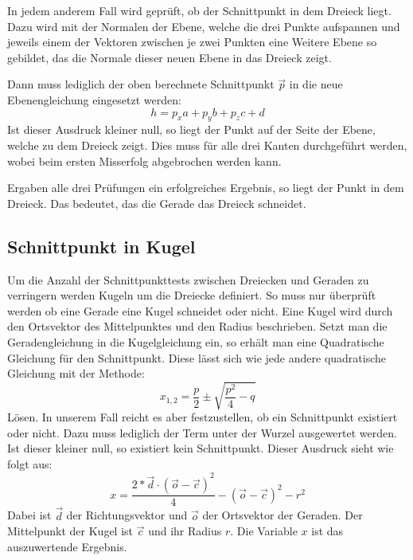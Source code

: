 \documentclass[final,a4paper,11pt,notitlepage,halfparskip]{scrreprt}
\begin{document}
In jedem anderem Fall wird geprüft, ob der Schnittpunkt in dem Dreieck liegt.
Dazu wird mit der Normalen der Ebene, welche die drei Punkte aufspannen und jeweils
einem der Vektoren zwischen je zwei Punkten eine Weitere Ebene so gebildet,
das die Normale dieser neuen Ebene in das Dreieck zeigt.

Dann muss lediglich der oben berechnete Schnittpunkt $\vec{p}$ in die neue
Ebenengleichung eingesetzt werden:
$$h = p_x a + p_y b + p_z c + d$$
Ist dieser Ausdruck kleiner null, so liegt der Punkt auf der Seite der Ebene,
welche zu dem Dreieck zeigt. Dies muss für alle drei Kanten durchgeführt werden,
wobei beim ersten Misserfolg abgebrochen werden kann.

Ergaben alle drei Prüfungen ein erfolgreiches Ergebnis, so liegt der Punkt in
dem Dreieck. Das bedeutet, das die Gerade das Dreieck schneidet.

\subsection{Schnittpunkt in Kugel}
Um die Anzahl der Schnittpunkttests zwischen Dreiecken und Geraden zu verringern
werden Kugeln um die Dreiecke definiert. So muss nur überprüft werden ob eine
Gerade eine Kugel schneidet oder nicht. Eine Kugel wird durch den Ortsvektor des
Mittelpunktes und den Radius beschrieben. Setzt man die Geradengleichung in die
Kugelgleichung ein, so erhält man eine Quadratische Gleichung für den
Schnittpunkt. Diese lässt sich wie jede andere quadratische Gleichung mit der
Methode:
$$x_{1,2} = \frac{p}{2} \pm \sqrt{\frac{p^2}{4} - q}$$ 
Lösen. In unserem Fall reicht es aber festzustellen, ob ein Schnittpunkt
existiert oder nicht. Dazu muss lediglich der Term unter der Wurzel ausgewertet
werden. Ist dieser kleiner null, so existiert kein Schnittpunkt. Dieser Ausdruck
sieht wie folgt aus:
$$x = \frac{ {2 * \vec{d} \cdot (\vec{o} - \vec{c})}^2 }{4} - {(\vec{o} -
\vec{c})}^2 - r^2$$
Dabei ist $\vec{d}$ der Richtungsvektor und $\vec{o}$ der Ortsvektor der
Geraden. Der Mittelpunkt der Kugel ist $\vec{c}$ und ihr Radius $r$. Die
Variable $x$ ist das auszuwertende Ergebnis.
\end{document}
